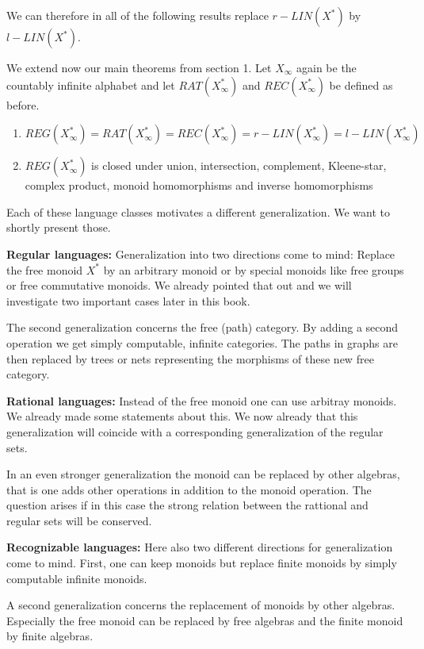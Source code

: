 We can therefore in all of the following results replace $r{-}LIN(X^*)$ by
$l{-}LIN(X^*)$.

We extend now our main theorems from section 1. Let $X_\infty$ again be the
countably infinite alphabet and let $RAT(X_\infty^*)$ and $REC(X_\infty^*)$ be
defined as before.

\begin{maintheorem}\leavevmode
\begin{enumerate}
  \item $ REG(X_\infty^*) = RAT(X_\infty^*) = REC(X_\infty^*) =
  r{-}LIN(X_\infty^*) = l{-}LIN(X_\infty^*) $
  \item $ REG(X_\infty^*)$ is closed under union, intersection,
  complement, Kleene-star, complex product, monoid homomorphisms and inverse
  homomorphisms
\end{enumerate}
\end{maintheorem}

Each of these language classes motivates a different generalization. We want to
shortly present those.

{\bf Regular languages:} Generalization into two directions come to mind: Replace the
free monoid $X^*$ by an arbitrary monoid or by special monoids like free groups or
free commutative monoids. We already pointed that out and we will investigate
two important cases later in this book.

The second generalization concerns the free (path) category. By adding a second
operation we get simply computable, infinite categories. The paths in graphs are
then replaced by trees or nets representing the morphisms of these new free 
category.

{\bf Rational languages:} Instead of the free monoid one can use arbitray monoids. We
already made some statements about this. We now already that this generalization
will coincide with a corresponding generalization of the regular sets.

In an even stronger generalization the monoid can be replaced by other algebras,
that is one adds other operations in addition to the monoid operation. The
question arises if in this case the strong relation between the rattional and
regular sets will be conserved.

{\bf Recognizable languages:} Here also two different directions for generalization
come to mind. First, one can keep monoids but replace finite monoids by simply
computable infinite monoids.

A second generalization concerns the replacement of monoids by other algebras.
Especially the free monoid can be replaced by free algebras and the finite
monoid by finite algebras.

